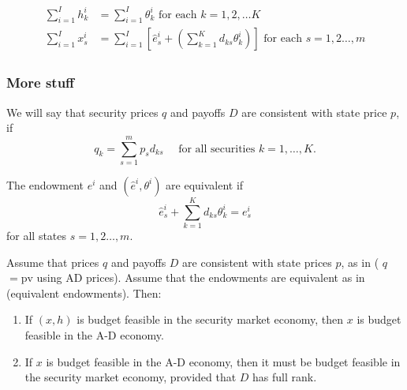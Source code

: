\documentclass[10pt]{article}
\begin{document}
\begin{align}
    \begin{aligned}
        \sum_{i=1}^I h_k^i & =\sum_{i=1}^I \theta_k^i \text { for each } k=1,2, \ldots K \\
        \sum_{i=1}^I x_s^i & =\sum_{i=1}^I\left[\hat{e}_s^i+\left(\sum_{k=1}^K d_{k s} \theta_k^i\right)\right] \text { for each } s=1,2 \ldots, m
    \end{aligned}
\end{align}

\subsubsection{More stuff}

\begin{definition} 
    We will say that security prices $q$ and payoffs $D$ are consistent with state price $p$, if
    $$
    q_k=\sum_{s=1}^m p_s d_{k s} \quad \text { for all securities } k=1, \ldots, K .
    $$
\end{definition}

\begin{definition}
    
    The endowment $e^i$ and $\left(\hat{e}^i, \theta^i\right)$ are equivalent if
    $$
    \hat{e}_s^i+\sum_{k=1}^K d_{k s} \theta_k^i=e_s^i
    $$
    for all states $s=1,2 \ldots, m$.
     
\end{definition}

\begin{proposition} 
    Assume that prices $q$ and payoffs $D$ are consistent with state prices $p$, as in ( $q$ $=\mathrm{pv}$ using $\mathrm{AD}$ prices). Assume that the endowments are equivalent as in (equivalent endowments). Then:
    
    \begin{enumerate}
        \item If $(x, h)$ is budget feasible in the security market economy, then $x$ is budget feasible in the A-D economy.
        \item If $x$ is budget feasible in the A-D economy, then it must be budget feasible in the security market economy, provided that $D$ has full rank. 
    \end{enumerate}

\end{proposition}
\end{document}
